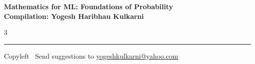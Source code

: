 \documentclass[8pt,landscape]{article}
\begin{document}
\footnotesize


\begin{center}
\Large{\textbf{Mathematics for ML: Foundations of Probability\\ Compilation: Yogesh Haribhau Kulkarni}}
\end{center}

\begin{multicols}{3}

\end{multicols}

\rule{\linewidth}{0.25pt}
\scriptsize
Copyleft \textcopyleft\  Send suggestions to
\href{http://www.yogeshkulkarni.com}{yogeshkulkarni@yahoo.com}
\end{document}
